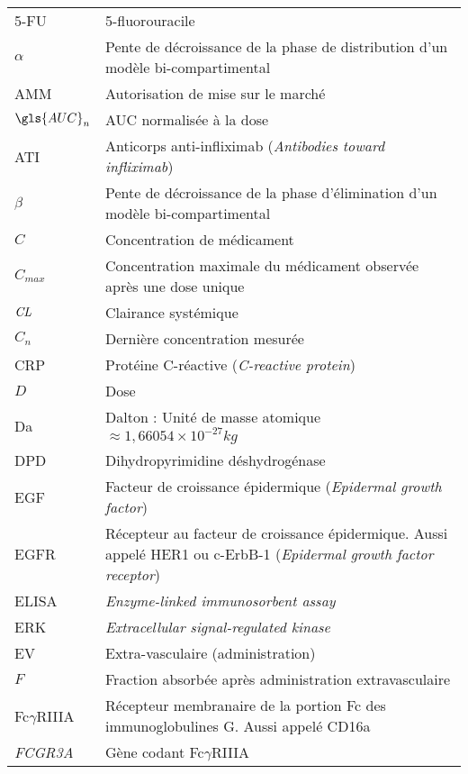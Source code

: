 \printglossaries

\begin{tabularx}{30em}{X X}
5-FU & 5-fluorouracile\\
$\alpha$ & 	Pente de décroissance de la phase de distribution d'un modèle bi-compartimental\\
AMM & 	Autorisation de mise sur le marché\\
$\gls{AUC}_n$ & 	AUC normalisée à la dose\\
ATI & 	Anticorps anti-infliximab (\textit{Antibodies toward infliximab})\\
$\beta$ & 	Pente de décroissance de la phase d'élimination d'un modèle bi-compartimental\\
$C$ & 	Concentration de médicament\\
$C_{max}$ & 	Concentration maximale du médicament observée après une dose unique\\
$\operatorname{\textit{CL}}$ & 	Clairance systémique\\
$C_n$ & 	Dernière concentration mesurée\\
CRP & 	Protéine C-réactive (\textit{C-reactive protein})\\
$D$ & 	Dose\\
Da & 	Dalton : Unité de masse atomique $\approx  1,66054\times 10^{-27} kg$\\
DPD & 	Dihydropyrimidine déshydrogénase\\
EGF & 	Facteur de croissance épidermique (\textit{Epidermal growth factor})\\
EGFR & 	Récepteur au facteur de croissance épidermique. Aussi appelé HER1 ou c-ErbB-1 (\textit{Epidermal growth factor receptor})\\
ELISA & 	\textit{Enzyme-linked immunosorbent assay}\\
ERK & 	\textit{Extracellular signal-regulated kinase}\\
EV & 	Extra-vasculaire (administration)\\
$F$ & 	Fraction absorbée après administration extravasculaire\\
Fc$\gamma$RIIIA & 	Récepteur membranaire de la portion Fc des immunoglobulines G. Aussi appelé CD16a\\
\textit{FCGR3A} & 	Gène codant Fc$\gamma$RIIIA\\

\end{tabularx}
